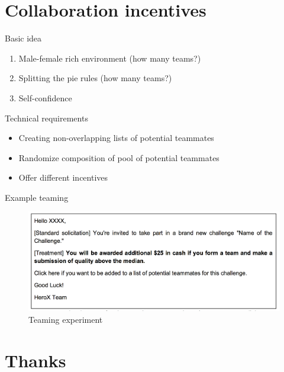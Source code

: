 \section{Collaboration incentives}\label{collaboration-incentives}

\begin{frame}{Basic idea}

\begin{enumerate}
\def\labelenumi{\arabic{enumi}.}
\tightlist
\item
  Male-female rich environment (how many teams?)
\item
  Splitting the pie rules (how many teams?)
\item
  Self-confidence
\end{enumerate}

\end{frame}

\begin{frame}{Technical requirements}

\begin{itemize}
\tightlist
\item
  Creating non-overlapping lists of potential teammates
\item
  Randomize composition of pool of potential teammates
\item
  Offer different incentives
\end{itemize}

\end{frame}

\begin{frame}{Example teaming}

\begin{figure}
\centering
\includegraphics{solicit_teaming.png}
\caption{Teaming experiment}
\end{figure}

\end{frame}

\section{Thanks}\label{thanks}


